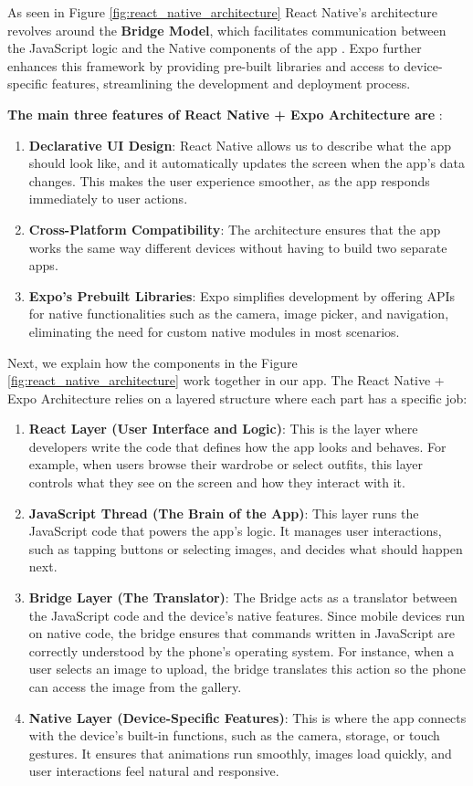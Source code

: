 As seen in Figure \ref{fig:react_native_architecture} React Native's architecture revolves around the \textbf{Bridge Model}, which facilitates communication between the JavaScript logic and the Native components of the app \cite{react_native_arch}. Expo further enhances this framework by providing pre-built libraries and access to device-specific features, streamlining the development and deployment process.


\noindent \textbf{The main three features of React Native + Expo Architecture are }:
\begin{enumerate}
    \item \textbf{Declarative UI Design}: React Native allows us to describe what the app should look like, and it automatically updates the screen when the app’s data changes. This makes the user experience smoother, as the app responds immediately to user actions.
    \item \textbf{Cross-Platform Compatibility}: The architecture ensures that the app works the same way different devices without having to build two separate apps.
    \item \textbf{Expo's Prebuilt Libraries}: Expo simplifies development by offering APIs for native functionalities such as the camera, image picker, and navigation, eliminating the need for custom native modules in most scenarios.
\end{enumerate}
Next, we explain how the components in the Figure \ref{fig:react_native_architecture} work together in our app.
The React Native + Expo Architecture relies on a layered structure where each part has a specific job:
\begin{enumerate}

    \item\textbf{React Layer (User Interface and Logic)}:
This is the layer where developers write the code that defines how the app looks and behaves. For example, when users browse their wardrobe or select outfits, this layer controls what they see on the screen and how they interact with it.

    \item \textbf{JavaScript Thread (The Brain of the App)}:
This layer runs the JavaScript code that powers the app’s logic. It manages user interactions, such as tapping buttons or selecting images, and decides what should happen next.

    \item \textbf{Bridge Layer (The Translator)}:
The Bridge acts as a translator between the JavaScript code and the device’s native features. Since mobile devices run on native code, the bridge ensures that commands written in JavaScript are correctly understood by the phone’s operating system. For instance, when a user selects an image to upload, the bridge translates this action so the phone can access the image from the gallery.

    \item \textbf{Native Layer (Device-Specific Features)}:
This is where the app connects with the device’s built-in functions, such as the camera, storage, or touch gestures. It ensures that animations run smoothly, images load quickly, and user interactions feel natural and responsive.
\end{enumerate}


